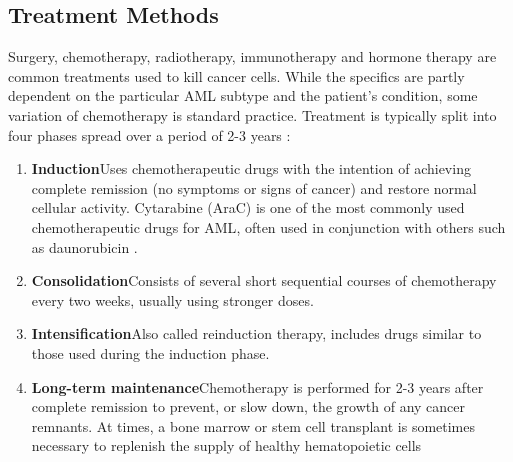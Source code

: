 
\subsection{ Treatment Methods}
\label{Treatment Methods}
Surgery, chemotherapy, radiotherapy, immunotherapy and hormone therapy are common treatments used to kill cancer cells. While the specifics are partly dependent on the particular \ac{AML} subtype and the patient's condition, some variation of chemotherapy is standard practice. Treatment is typically split into four phases spread over a period of 2-3 years \citep{malard2020acute}:  

\begin{enumerate}
\item \textbf{Induction}\hspace{0.2cm}Uses chemotherapeutic drugs with the intention of achieving complete remission (no symptoms or signs of cancer) and restore normal cellular activity. Cytarabine (AraC) is one of the most commonly used chemotherapeutic drugs for \ac{AML}, often used in conjunction with others such as daunorubicin \citep{Robak2009}.
\item \textbf{Consolidation}\hspace{0.2cm}Consists of several short sequential courses of chemotherapy every two weeks, usually using stronger doses.
\item \textbf{Intensification}\hspace{0.2cm}Also called reinduction therapy, includes drugs similar to those used during the induction phase.
\item \textbf{Long-term maintenance}\hspace{0.2cm}Chemotherapy is performed for 2-3 years after complete remission to prevent, or slow down, the growth of any cancer remnants. At times, a bone marrow or stem cell transplant is sometimes necessary to replenish the supply of healthy hematopoietic cells
\end{enumerate}


